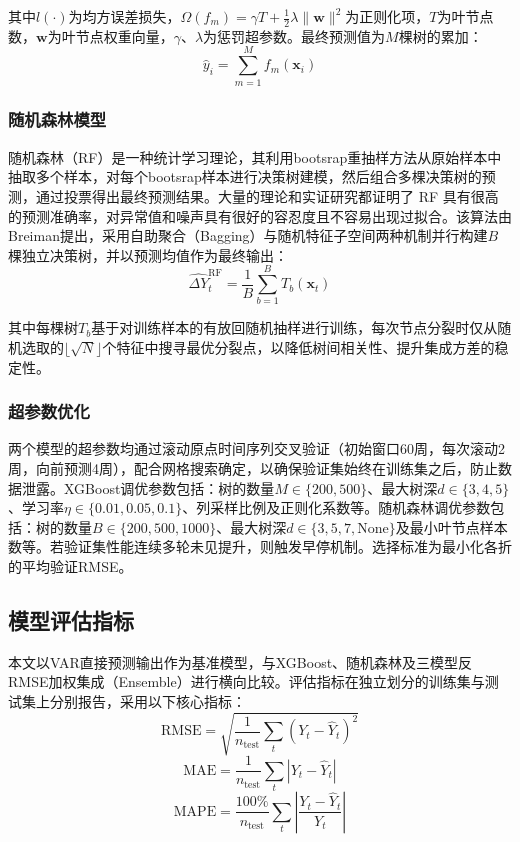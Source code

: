 \documentclass[a4paper,12pt,fontset=fandol]{ctexart}
\begin{document}
其中$l(\cdot)$为均方误差损失，$\Omega(f_m)=\gamma T+\frac{1}{2}\lambda\|\mathbf{w}\|^2$为正则化项，$T$为叶节点数，$\mathbf{w}$为叶节点权重向量，$\gamma$、$\lambda$为惩罚超参数。最终预测值为$M$棵树的累加：
\begin{equation}
\hat{y}_i = \sum_{m=1}^{M}f_m(\mathbf{x}_i)
\end{equation}

\subsubsection{随机森林模型}
随机森林（RF）是一种统计学习理论，其利用bootsrap重抽样方法从原始样本中抽取多个样本，对每个bootsrap样本进行决策树建模，然后组合多棵决策树的预测，通过投票得出最终预测结果\cite{fang2011}。大量的理论和实证研究都证明了 RF 具有很高的预测准确率，对异常值和噪声具有很好的容忍度且不容易出现过拟合。该算法由Breiman\cite{breiman2001}提出，采用自助聚合（Bagging）与随机特征子空间两种机制并行构建$B$棵独立决策树，并以预测均值作为最终输出：
\begin{equation}
\widehat{\Delta Y}_t^{\text{RF}} = \frac{1}{B}\sum_{b=1}^{B}T_b(\mathbf{x}_t)
\end{equation}

其中每棵树$T_b$基于对训练样本的有放回随机抽样进行训练，每次节点分裂时仅从随机选取的$\lfloor\sqrt{N}\rfloor$个特征中搜寻最优分裂点，以降低树间相关性、提升集成方差的稳定性。

\subsubsection{超参数优化}

两个模型的超参数均通过滚动原点时间序列交叉验证（初始窗口60周，每次滚动2周，向前预测4周），配合网格搜索确定，以确保验证集始终在训练集之后，防止数据泄露。XGBoost调优参数包括：树的数量$M\in\{200,500\}$、最大树深$d\in\{3,4,5\}$、学习率$\eta\in\{0.01,0.05,0.1\}$、列采样比例及正则化系数等。随机森林调优参数包括：树的数量$B\in\{200,500,1000\}$、最大树深$d\in\{3,5,7,\text{None}\}$及最小叶节点样本数等。若验证集性能连续多轮未见提升，则触发早停机制。选择标准为最小化各折的平均验证RMSE。

\subsection{模型评估指标}
本文以VAR直接预测输出作为基准模型，与XGBoost、随机森林及三模型反RMSE加权集成（Ensemble）进行横向比较。评估指标在独立划分的训练集与测试集上分别报告，采用以下核心指标：
\begin{equation}
\text{RMSE}=\sqrt{\frac{1}{n_{\text{test}}}\sum_t(Y_t-\hat{Y}_t)^2}
\end{equation}
\begin{equation}
\text{MAE}=\frac{1}{n_{\text{test}}}\sum_t|Y_t-\hat{Y}_t|
\end{equation}
\begin{equation}
\text{MAPE}=\frac{100\%}{n_{\text{test}}}\sum_t\left|\frac{Y_t-\hat{Y}_t}{Y_t}\right|
\end{equation}
\end{document}
